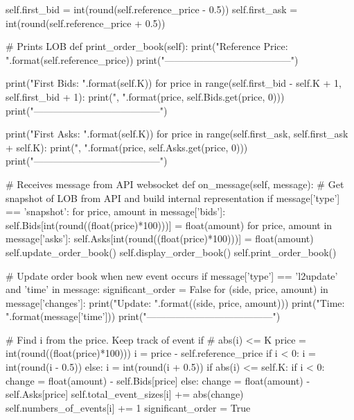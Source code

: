         self.first_bid = int(round(self.reference_price - 0.5))
        self.first_ask = int(round(self.reference_price + 0.5))
    
    # Prints LOB
    def print_order_book(self):
        print("Reference Price: {}".format(self.reference_price))
        print("---------------------------------------")
        
        print("First {} Bids: ".format(self.K))
        for price in range(self.first_bid - self.K + 1, self.first_bid + 1):
            print("{}, {}".format(price, self.Bids.get(price, 0)))
        print("---------------------------------------")
        
        print("First {} Asks: ".format(self.K))
        for price in range(self.first_ask, self.first_ask + self.K):
            print("{}, {}".format(price, self.Asks.get(price, 0)))
        print("---------------------------------------")
     
    # Receives message from API websocket
    def on_message(self, message):
        # Get snapshot of LOB from API and build internal representation
        if message['type'] == 'snapshot':
            for price, amount in message['bids']:
                self.Bids[int(round((float(price)*100)))] = float(amount)
            for price, amount in message['asks']:
                self.Asks[int(round((float(price)*100)))] = float(amount)
            self.update_order_book()
            self.display_order_book()
            self.print_order_book()
            
        # Update order book when new event occurs
        if message['type'] == 'l2update' and 'time' in message:
            significant_order = False
            for (side, price, amount) in message['changes']:
                print("Update: {}".format((side, price, amount)))
                print("Time: {}".format(message['time']))
                print("---------------------------------------")
                
                # Find i from the price. Keep track of event if
                # abs(i) <= K
                price = int(round((float(price)*100)))  
                i = price - self.reference_price
                if i < 0:
                    i = int(round(i - 0.5))
                else:
                    i = int(round(i + 0.5))
                if abs(i) <= self.K:
                    if i < 0:
                        change = float(amount) - self.Bids[price]
                    else:
                        change = float(amount) - self.Asks[price]
                    self.total_event_sizes[i] += abs(change)
                    self.numbers_of_events[i] += 1
                    significant_order = True
                    
